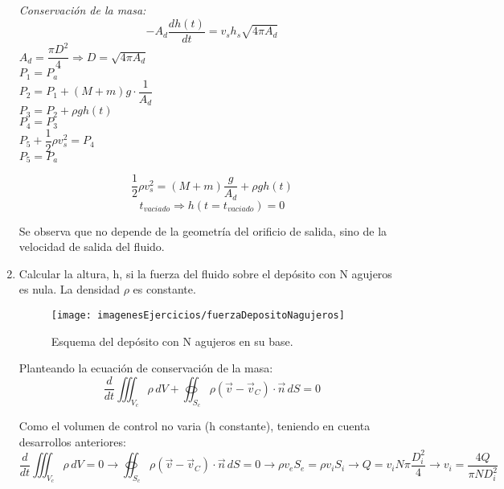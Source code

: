\begin{enumerate}
\blue
	\textit{Conservación de la masa:}
		\[-A_d \dfrac{dh(t)}{dt} = v_s h_s \sqrt{4\pi A_d}\]
		$A_d = \dfrac{\pi D^2}{4} \Rightarrow D = \sqrt{4\pi A_d}$\\
		$P_1 = P_a$\\
		$P_2 = P_1 + (M + m)g \cdot \dfrac{1}{A_d}$\\
		$P_3 = P_2 + \rho g h(t)$\\
		$P_4 = P_3$\\
		$P_5 + \dfrac{1}{2}\rho v_s^2 = P_4$\\
		$P_5 = P_a$
		
		\[\dfrac{1}{2}\rho v_s^2 = (M + m)\dfrac{g}{A_d} + \rho g h(t)\]
		\[t_{vaciado} \Rightarrow h(t = t_{vaciado}) = 0\]
		
	Se observa que no depende de la geometría del orificio de salida, sino de la velocidad de salida del fluido.
\black
\newpage
\item Calcular la altura, h, si la fuerza del fluido sobre el depósito con N agujeros es nula. La densidad $\rho$ es constante.
\begin{figure}[H]
	\centering
	\texttt{[image: imagenesEjercicios/fuerzaDepositoNagujeros]}
	\caption{Esquema del depósito con N agujeros en su base.}
	\label{fig:fuerzadepositonagujeros}
\end{figure}
\blue
 Planteando la ecuación de conservación de la masa:
 \[\dfrac{d}{dt}\iiint_{V_c}\rho \,dV+\oiint_{S_c}\rho\left(\vec{v}-\vec{v}_C\right)\cdot \vec{n} \,dS=0\]
 
 
 
 Como el volumen de control no varia (h constante), teniendo en cuenta desarrollos anteriores:
 \[\dfrac{d}{dt}\iiint_{V_c}\rho \,dV=0\rightarrow \oiint_{S_c}\rho\left(\vec{v}-\vec{v}_C\right)\cdot \vec{n} \,dS=0\rightarrow \rho v_e S_e=\rho v_i S_i \rightarrow Q= v_i N\pi\dfrac{D_i^2}{4} \rightarrow v_i=\dfrac{4Q}{\pi N D_i^2}\]




\end{enumerate}

